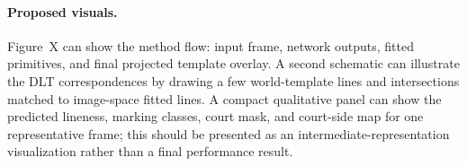 \paragraph{Proposed visuals.}
Figure~X can show the method flow: input frame, network outputs, fitted primitives, and final projected template overlay.  A second schematic can illustrate the DLT correspondences by drawing a few world-template lines and intersections matched to image-space fitted lines.  A compact qualitative panel can show the predicted lineness, marking classes, court mask, and court-side map for one representative frame; this should be presented as an intermediate-representation visualization rather than a final performance result.
